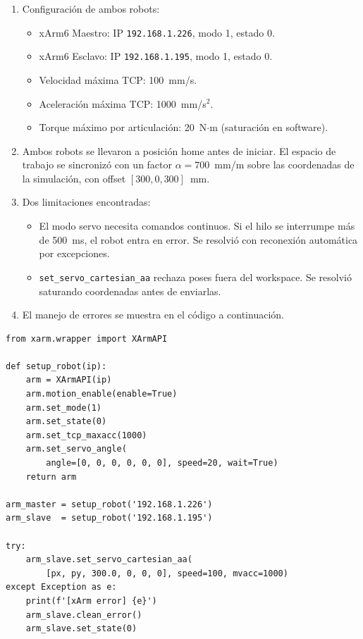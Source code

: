 \documentclass[journal,10pt,twoside]{IEEEtran}
\begin{document}
\begin{enumerate}[label=(\alph*)]

\item Configuración de ambos robots:
\begin{itemize}
    \item xArm6 Maestro: IP \texttt{192.168.1.226}, modo 1, estado 0.
    \item xArm6 Esclavo: IP \texttt{192.168.1.195}, modo 1, estado 0.
    \item Velocidad máxima TCP: 100~mm/s.
    \item Aceleración máxima TCP: 1000~mm/s$^2$.
    \item Torque máximo por articulación: 20~N$\cdot$m (saturación en software).
\end{itemize}

\item Ambos robots se llevaron a posición home antes de iniciar.
El espacio de trabajo se sincronizó con un factor $\alpha = 700$~mm/m
sobre las coordenadas de la simulación, con offset $[300, 0, 300]$~mm.

\item Dos limitaciones encontradas:
\begin{itemize}
    \item El modo servo necesita comandos continuos. Si el hilo se
    interrumpe más de 500~ms, el robot entra en error.
    Se resolvió con reconexión automática por excepciones.
    \item \texttt{set\_servo\_cartesian\_aa} rechaza poses fuera del
    workspace. Se resolvió saturando coordenadas antes de enviarlas.
\end{itemize}

\item El manejo de errores se muestra en el código a continuación.

\end{enumerate}

\begin{lstlisting}[caption={Configuración inicial de los xArm6},
                   label={lst:setup}]
from xarm.wrapper import XArmAPI

def setup_robot(ip):
    arm = XArmAPI(ip)
    arm.motion_enable(enable=True)
    arm.set_mode(1)
    arm.set_state(0)
    arm.set_tcp_maxacc(1000)
    arm.set_servo_angle(
        angle=[0, 0, 0, 0, 0, 0], speed=20, wait=True)
    return arm

arm_master = setup_robot('192.168.1.226')
arm_slave  = setup_robot('192.168.1.195')

try:
    arm_slave.set_servo_cartesian_aa(
        [px, py, 300.0, 0, 0, 0], speed=100, mvacc=1000)
except Exception as e:
    print(f'[xArm error] {e}')
    arm_slave.clean_error()
    arm_slave.set_state(0)
\end{lstlisting}
\end{document}
